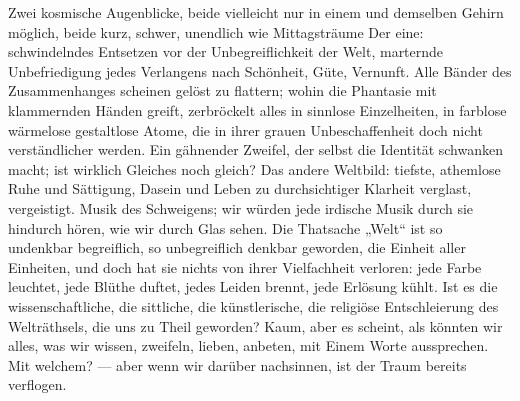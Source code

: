 Zwei kosmische Augenblicke, beide vielleicht nur in einem und demselben Gehirn möglich, beide kurz, schwer, unendlich wie Mittagsträume Der eine: schwindelndes Entsetzen vor der Unbegreiflichkeit der Welt, marternde Unbefriedigung jedes Verlangens nach Schönheit, Güte, Vernunft. Alle Bänder des Zusammenhanges scheinen gelöst zu flattern; wohin die Phantasie mit klammernden Händen greift, zerbröckelt alles in sinnlose Einzelheiten, in farblose wärmelose gestaltlose Atome, die in ihrer grauen Unbeschaffenheit doch nicht verständlicher werden. Ein gähnender Zweifel, der selbst die Identität schwanken macht; ist wirklich Gleiches noch gleich? Das andere Weltbild: tiefste, athemlose Ruhe und Sättigung, Dasein und Leben zu durchsichtiger Klarheit verglast, vergeistigt. Musik des Schweigens; wir würden jede irdische Musik durch sie hindurch hören, wie wir durch Glas sehen. Die Thatsache „Welt“ ist so undenkbar begreiflich, so unbegreiflich denkbar geworden, die Einheit aller Einheiten, und doch hat sie nichts von ihrer Vielfachheit verloren: jede Farbe leuchtet, jede Blüthe duftet, jedes Leiden brennt, jede Erlösung kühlt. Ist es die wissenschaftliche, die sittliche, die künstlerische, die religiöse Entschleierung des Welträthsels, die uns zu Theil geworden? Kaum, aber es scheint, als könnten wir alles, was wir wissen, zweifeln, lieben, anbeten, mit Einem Worte aussprechen. Mit welchem? — aber wenn wir darüber nachsinnen, ist der Traum bereits verflogen.
\par


